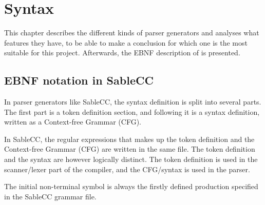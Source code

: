 \chapter{Syntax}
\label{chap:BFGLSyntax}
This chapter describes the different kinds of parser generators and analyses what features they have, to be able to make a conclusion for which one is the most suitable for this project. Afterwards, the EBNF description of \lang{} is presented.


\section{EBNF notation in SableCC}
\label{sec:EBNFinSable}
In parser generators like SableCC, the syntax definition is split into several parts. The first part is a token definition section, and following it is a syntax definition, written as a Context-free Grammar (CFG).

In SableCC, the regular expressions that makes up the token definition and the Context-free Grammar (CFG) are written in the same file. The token definition and the syntax are however logically distinct. The token definition is used in the scanner/lexer part of the compiler, and the CFG/syntax is used in the parser.

The initial non-terminal symbol is always the firstly defined production specified in the SableCC grammar file. 


